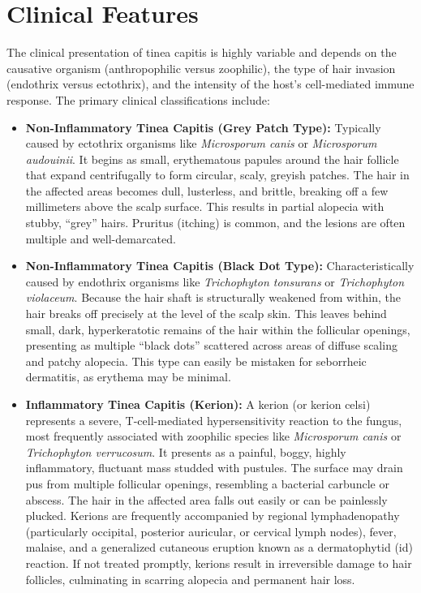 \section*{Clinical Features}
The clinical presentation of tinea capitis is highly variable and depends on the causative organism (anthropophilic versus zoophilic), the type of hair invasion (endothrix versus ectothrix), and the intensity of the host's cell-mediated immune response. The primary clinical classifications include:
\begin{itemize}
    \item \textbf{Non-Inflammatory Tinea Capitis (Grey Patch Type):} Typically caused by ectothrix organisms like \textit{Microsporum canis} or \textit{Microsporum audouinii}. It begins as small, erythematous papules around the hair follicle that expand centrifugally to form circular, scaly, greyish patches. The hair in the affected areas becomes dull, lusterless, and brittle, breaking off a few millimeters above the scalp surface. This results in partial alopecia with stubby, ``grey'' hairs. Pruritus (itching) is common, and the lesions are often multiple and well-demarcated.
    \item \textbf{Non-Inflammatory Tinea Capitis (Black Dot Type):} Characteristically caused by endothrix organisms like \textit{Trichophyton tonsurans} or \textit{Trichophyton violaceum}. Because the hair shaft is structurally weakened from within, the hair breaks off precisely at the level of the scalp skin. This leaves behind small, dark, hyperkeratotic remains of the hair within the follicular openings, presenting as multiple ``black dots'' scattered across areas of diffuse scaling and patchy alopecia. This type can easily be mistaken for seborrheic dermatitis, as erythema may be minimal.
    \item \textbf{Inflammatory Tinea Capitis (Kerion):} A kerion (or kerion celsi) represents a severe, T-cell-mediated hypersensitivity reaction to the fungus, most frequently associated with zoophilic species like \textit{Microsporum canis} or \textit{Trichophyton verrucosum}. It presents as a painful, boggy, highly inflammatory, fluctuant mass studded with pustules. The surface may drain pus from multiple follicular openings, resembling a bacterial carbuncle or abscess. The hair in the affected area falls out easily or can be painlessly plucked. Kerions are frequently accompanied by regional lymphadenopathy (particularly occipital, posterior auricular, or cervical lymph nodes), fever, malaise, and a generalized cutaneous eruption known as a dermatophytid (id) reaction. If not treated promptly, kerions result in irreversible damage to hair follicles, culminating in scarring alopecia and permanent hair loss.

\end{itemize}
